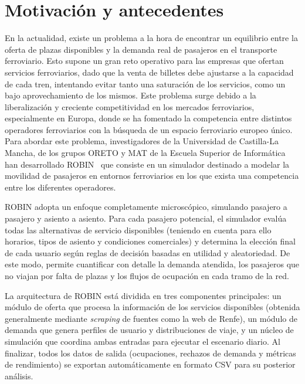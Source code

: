 \chapter{Motivación y antecedentes}
\label{ch:antecedentes}

En la actualidad, existe un problema a la hora de encontrar un equilibrio entre la oferta de plazas disponibles y la demanda real de pasajeros en el transporte ferroviario. Esto supone un gran reto operativo para las empresas que ofertan servicios ferroviarios, dado que la venta de billetes debe ajustarse a la capacidad de cada tren, intentando evitar tanto una saturación de los servicios, como un bajo aprovechamiento de los mismos. Este problema surge debido a la liberalización y creciente competitividad en los mercados ferroviarios, especialmente en Europa, donde se ha fomentado la competencia entre distintos operadores ferroviarios con la búsqueda de un espacio ferroviario europeo único. Para abordar este problema, investigadores de la Universidad de Castilla-La Mancha, de los grupos ORETO y MAT de la Escuela Superior de Informática han desarrollado \acrfull{ROBIN}~\cite{delCastilloHerrera2024ROBIN} que consiste en un simulador destinado a modelar la movilidad de pasajeros en entornos ferroviarios en los que exista una competencia entre los diferentes operadores. 

\acrshort{ROBIN} adopta un enfoque completamente microscópico, simulando pasajero a pasajero y asiento a asiento. Para cada pasajero potencial, el simulador evalúa todas las alternativas de servicio disponibles (teniendo en cuenta para ello horarios, tipos de asiento y condiciones comerciales) y determina la elección final de cada usuario según reglas de decisión basadas en utilidad y aleatoriedad. De este modo, permite cuantificar con detalle la demanda atendida, los pasajeros que no viajan por falta de plazas y los flujos de ocupación en cada tramo de la red.

La arquitectura de \acrshort{ROBIN} está dividida en tres componentes principales: un módulo de oferta que procesa la información de los servicios disponibles (obtenida generalmente mediante \textit{scraping} de fuentes como la web de Renfe), un módulo de demanda que genera perfiles de usuario y distribuciones de viaje, y un núcleo de simulación que coordina ambas entradas para ejecutar el escenario diario. Al finalizar, todos los datos de salida (ocupaciones, rechazos de demanda y métricas de rendimiento) se exportan automáticamente en formato \acrshort{CSV} para su posterior análisis.

